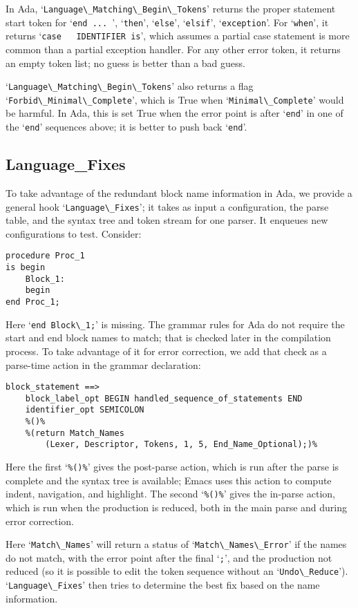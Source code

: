 \documentclass[authordraft]{acmart}
\newcommand{\code}[1]{`\lstinline|#1|'}
\begin{document}
In Ada, \code{Language\_Matching\_Begin\_Tokens} returns the proper
statement start token for \code{end ... }, \code{then}, \code{else},
\code{elsif}, \code{exception}. For \code{when}, it returns \code{case
  IDENTIFIER is}, which assumes a partial case statement is more
common than a partial exception handler. For any other error token, it
returns an empty token list; no guess is better than a bad guess.

\code{Language\_Matching\_Begin\_Tokens} also returns a flag
\code{Forbid\_Minimal\_Complete}, which is True when
\code{Minimal\_Complete} would be harmful. In Ada, this is set True
when the error point is after \code{end} in one of the \code{end}
sequences above; it is better to push back \code{end}.

\subsection{Language\_Fixes}
To take advantage of the redundant block name information in Ada, we
provide a general hook \code{Language\_Fixes}; it takes as input a
configuration, the parse table, and the syntax tree and token stream
for one parser. It enqueues new configurations to test. Consider:
\begin{lstlisting}
procedure Proc_1
is begin
    Block_1:
    begin
end Proc_1;
\end{lstlisting}
Here \code{end Block\_1;} is missing. The grammar rules for Ada do not
require the start and end block names to match; that is checked later
in the compilation process. To take advantage of it for error
correction, we add that check as a parse-time action in the grammar
declaration:
\begin{verbatim}
block_statement ==>
    block_label_opt BEGIN handled_sequence_of_statements END
    identifier_opt SEMICOLON
    %()%
    %(return Match_Names
        (Lexer, Descriptor, Tokens, 1, 5, End_Name_Optional);)%
\end{verbatim}
Here the first `\verb|%()%|' gives the post-parse action, which is run
after the parse is complete and the syntax tree is available; Emacs
uses this action to compute indent, navigation, and highlight. The
second `\verb|%()%|' gives the in-parse action, which is run when the
production is reduced, both in the main parse and during error
correction.

Here \code{Match\_Names} will return a status of
\code{Match\_Names\_Error} if the names do not match, with the error
point after the final \code{;}, and the production not reduced (so it
is possible to edit the token sequence without an
\code{Undo\_Reduce}). \code{Language\_Fixes} then tries to determine
the best fix based on the name information.
\end{document}
